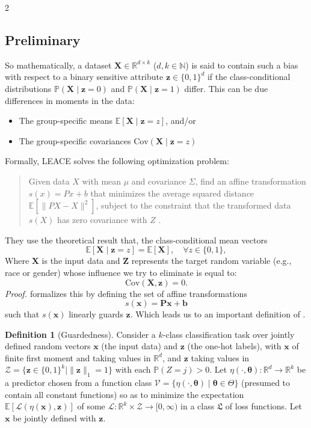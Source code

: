 \documentclass[ecta,nameyear,final]{econsocart}
\numberwithin{equation}{section}
\theoremstyle{plain}
\theoremstyle{definition}
\newtheorem{definition}{Definition}
\begin{document}
\begin{multicols}{2}
\subsection{Preliminary}
So mathematically, a dataset $\mathbf{X} \in \mathbb{R}^{d \times k}$ ($d,k \in \mathbb{N}$) is said to contain such a bias with respect to a binary sensitive attribute $\mathbf{z} \in \{0,1\}^d$ if the class-conditional distributions $\mathbb{P}(\mathbf{X} \mid \mathbf{z} = 0)$ and $\mathbb{P}(\mathbf{X} \mid \mathbf{z} = 1)$ differ. This can be due differences in moments in the data:
\begin{itemize}
    \item The group-specific means $\mathbb{E}[ \mathbf{X} \mid \mathbf{z} = z]$, and/or
    \item The group-specific covariances $\text{Cov}(\mathbf{X} \mid \mathbf{z} = z)$
\end{itemize}
Formally, LEACE solves the following optimization problem:
\begin{quote}
    Given data $X$ with mean $\mu$ and covariance $\Sigma$, find an affine transformation $s(x) = Px + b$ that minimizes the average squared distance \newline $\mathbb{E}[\|PX - X\|^2]$, subject to the constraint that the transformed data $s(X)$ has zero covariance with $Z$ \citep{Belrose2023}.
\end{quote}
They use the theoretical result that, the class-conditional mean vectors
$$
\mathbb{E}[\mathbf{X} \mid \mathbf{z}=z] = \mathbb{E}[\mathbf{X}], \quad \forall z \in \{0,1\},
$$
Where $\mathbf{X}$ is the input data and $\mathbf{Z}$ represents the target random variable (e.g., race or gender) whose influence we try to eliminate is equal to:
$$
\text{Cov}(\mathbf{X},\mathbf{z}) = 0.
$$
\emph{Proof. \citep{Belrose2023}}
\newline \newline
\cite{Belrose2023} formalizes this by defining the set of affine transformations
$$
s(\mathbf{x}) = \mathbf{P}\mathbf{x} + \mathbf{b}
$$
such that $s(\mathbf{x})$ linearly guards $\mathbf{z}$.
Which leads us to an important definition of \cite{Belrose2023}.
\begin{definition}[Guardedness]
    Consider a $k$-class classification task over jointly defined random vectors $\mathbf{x}$ (the input data) and $\mathbf{z}$ (the one-hot labels), with $\mathbf{x}$ of finite first moment and taking values in $\mathbb{R}^d$, and $\mathbf{z}$ taking values in $\mathcal{Z} = \{ \mathbf{z} \in \{0,1\}^k \mid \|\mathbf{z}\|_1 = 1 \}$ with each $\mathbb{P}(Z = j)>0$. Let $\eta(\cdot,\boldsymbol{\theta}) : \mathbb{R}^d \to \mathbb{R}^k$ be a predictor chosen from a function class $\mathcal{V} = \{\eta(\cdot,\boldsymbol{\theta}) \mid \boldsymbol{\theta} \in \Theta \}$ (presumed to contain all constant functions) so as to minimize the expectation $\mathbb{E}[\mathcal{L}(\eta(\mathbf{x}),\mathbf{z})]$ of some $\mathcal{L}: \mathbb{R}^k \times \mathcal{Z} \to [0,\infty)$ in a class $\mathfrak{L}$ of loss functions. Let $\mathbf{x}$ be jointly defined with $\mathbf{z}$.

\end{definition}
\end{multicols}
\end{document}
